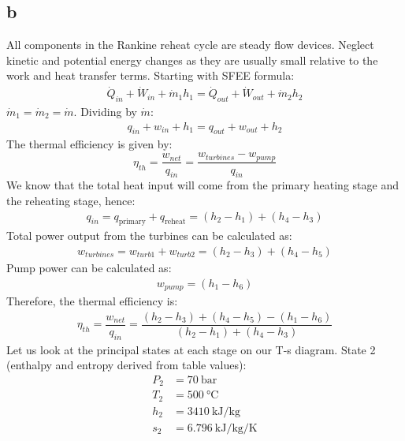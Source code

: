 \documentclass[11pt]{article}
\numberwithin{equation}{section}
\begin{document}
\subsection{b}
All components in the Rankine reheat cycle are steady flow devices. Neglect kinetic and potential energy changes as they are usually small relative to the work and heat transfer terms. Starting with SFEE formula:
\begin{align}
    \dot{Q}_{in} + \dot{W}_{in} + \dot{m}_1 h_1 = \dot{Q}_{out} + \dot{W}_{out} + \dot{m}_2 h_2
\end{align}
$\dot{m}_1 = \dot{m}_2 = \dot{m}$. Dividing by $\dot{m}$:
\begin{align}
    q_{in} + w_{in} + h_1 = q_{out} + w_{out} + h_2
\end{align}
The thermal efficiency is given by:
\begin{equation}
    \eta_{th} = \dfrac{w_{net}}{q_{in}} = \dfrac{w_{turbines} - w_{pump}}{q_{in}}
\end{equation}
We know that the total heat input will come from the primary heating stage and the reheating stage, hence:
\begin{align}
    q_{in} = q_{\textrm{primary}} + q_{\textrm{reheat}} = \left(h_2 - h_1\right) + \left(h_4 - h_3\right)
\end{align}
Total power output from the turbines can be calculated as:
\begin{align}
    w_{turbines} = w_{turb1} + w_{turb2} = \left(h_2 - h_3\right) + \left(h_4 - h_5\right)
\end{align}
Pump power can be calculated as:
\begin{align}
    w_{pump} = \left(h_1 - h_6\right)
\end{align}
Therefore, the thermal efficiency is:
\begin{align}
    \eta_{th} = \dfrac{w_{net}}{q_{in}} = \dfrac{\left(h_2 - h_3\right) + \left(h_4 - h_5\right) - \left(h_1 - h_6\right)}{\left(h_2 - h_1\right) + \left(h_4 - h_3\right)}
\end{align}
Let us look at the principal states at each stage on our T-s diagram. State 2 (enthalpy and entropy derived from table values):
\begin{align}
    P_2 &= \SI{70}{\bar}\\
    T_2 &= \SI{500}{\celsius}\\
    h_2 &= \SI{3410}{\kilo\joule\per\kg}\\
    s_2 &= \SI{6.796}{\kilo\joule\per\kg\per\kelvin}
\end{align}
\end{document}
